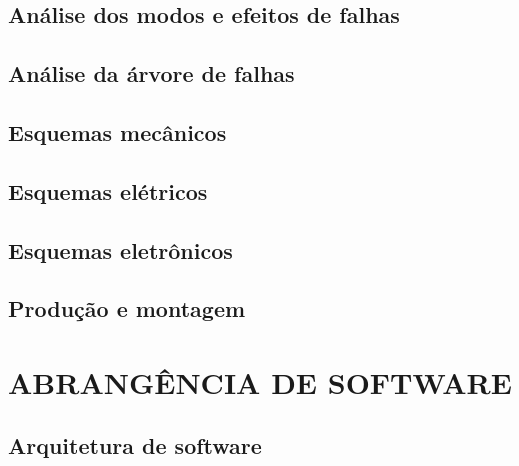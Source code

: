 \section{Análise dos modos e efeitos de falhas}
\label{sec:hwfmeca}

\section{Análise da árvore de falhas}
\label{sec:hwfta}

\section{Esquemas mecânicos}
\label{sec:esqmec}

\section{Esquemas elétricos}
\label{sec:esqelet}

\section{Esquemas eletrônicos}
\label{sec:esqele}

\section{Produção e montagem}
\label{sec:prodmont}

\chapter{ABRANGÊNCIA DE SOFTWARE}
\label{chap:abrsw}

\section{Arquitetura de software}
\label{sec:arqsw}

